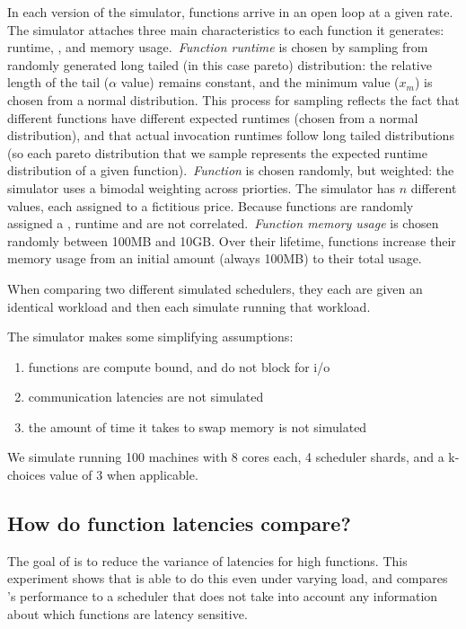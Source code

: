 In each version of the simulator, functions arrive in an open loop at a given
rate. The simulator attaches three main characteristics to each function it
generates: runtime, \priceclass{}, and memory usage.\ \textit{Function runtime}
is chosen by sampling from randomly generated long tailed (in this case pareto)
distribution: the relative length of the tail ($\alpha$ value) remains constant,
and the minimum value ($x_m$) is chosen from a normal distribution. This process
for sampling reflects the fact that different functions have different expected
runtimes (chosen from a normal distribution), and that actual invocation
runtimes follow long tailed distributions (so each pareto distribution that we
sample represents the expected runtime distribution of a given function).\
\textit{Function \class{}} is chosen randomly, but weighted: the simulator uses
a bimodal weighting across priorties. The simulator has $n$ different
\priceclass{} values, each assigned to a fictitious price. Because functions are
randomly assigned a \class{}, runtime and \class{} are not correlated.\
\textit{Function memory usage} is chosen randomly between 100MB and 10GB. Over
their lifetime, functions increase their memory usage from an initial amount
(always 100MB) to their total usage.

When comparing two different simulated schedulers, they each are given an
identical workload and then each simulate running that workload.

The simulator makes some simplifying assumptions:
\begin{enumerate}
    \item functions are compute bound, and do not block for i/o
    \item communication latencies are not simulated
    \item the amount of time it takes to swap memory is not simulated
\end{enumerate}

We simulate running 100 machines with 8 cores each, 4 scheduler shards, and a
k-choices value of 3 when applicable.

\subsection{How do function latencies compare?}

The goal of \sys{} is to reduce the variance of latencies for high \priceclass{}
functions. This experiment shows that \sys{} is able to do this even under
varying load, and compares \sys{}'s performance to a scheduler that does not
take into account any information about which functions are latency sensitive.

